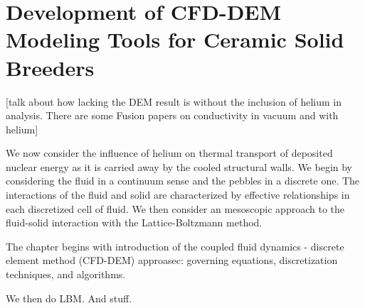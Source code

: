 \chapter{Development of CFD-DEM Modeling Tools for Ceramic Solid Breeders} \label{sec:modeling-cfd-dem}
[talk about how lacking the DEM result is without the inclusion of helium in analysis. There are some Fusion papers on conductivity in vacuum and with helium]

We now consider the influence of helium on thermal transport of deposited nuclear energy as it is carried away by the cooled structural walls. We begin by considering the fluid in a continuum sense and the pebbles in a discrete one. The interactions of the fluid and solid are characterized by effective relationships in each discretized cell of fluid. We then consider an mesoscopic approach to the fluid-solid interaction with the Lattice-Boltzmann method. 

The chapter begins with introduction of the coupled fluid dynamics - discrete element method (CFD-DEM) approasec: governing equations, discretization techniques, and algorithms.

We then do LBM. And stuff.




